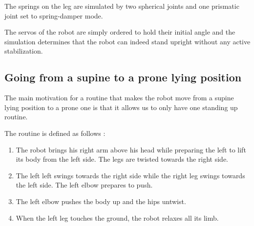 The springs on the leg are simulated by two spherical joints and one prismatic joint set to spring-damper mode.

The servos of the robot are simply ordered to hold their initial angle and the simulation determines that the robot can indeed stand upright without any active stabilization.

\subsection{Going from a supine to a prone lying position}
The main motivation for a routine that makes the robot move from a supine lying position to a prone one is that it allows us to only have one standing up routine. 

The routine is defined as follows :\begin{enumerate}
\item The robot brings his right arm above his head while preparing the left to lift its body from the left side. The legs are twisted towards the right side.

\item The left left swings towards the right side while the right leg swings towards the left side. The left elbow prepares to push.

\item The left elbow pushes the body up and the hips untwist.

\item When the left leg touches the ground, the robot relaxes all its limb.
\end{enumerate}

